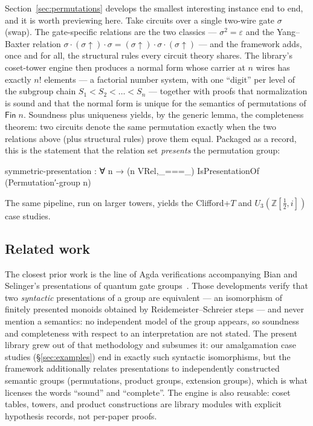 Section~\ref{sec:permutations} develops the smallest interesting instance
end to end, and it is worth previewing here.  Take circuits over a single
two-wire gate $\sigma$ (swap).  The gate-specific relations are the two
classics --- $\sigma^2 = \varepsilon$ and the Yang--Baxter relation $\sigma
\cdot (\sigma{\uparrow}) \cdot \sigma = (\sigma{\uparrow}) \cdot \sigma \cdot
(\sigma{\uparrow})$ --- and the framework adds, once and for all, the
structural rules every circuit theory shares.  The library's coset-tower
engine then produces a normal form whose carrier at $n$ wires has exactly
$n!$ elements --- a factorial number system, with one ``digit'' per level of
the subgroup chain $S_1 < S_2 < \dots < S_n$ --- together with proofs that
normalization is sound and that the normal form is unique for the semantics
of permutations of $\mathsf{Fin}\;n$.  Soundness plus uniqueness yields, by
the generic lemma, the completeness theorem: two circuits denote the same
permutation exactly when the two relations above (plus structural rules)
prove them equal.  Packaged as a record, this is the statement that the
relation set \emph{presents} the permutation group:
\begin{agdacode}
symmetric-presentation :
  ∀ n → (n VRel,_===_) IsPresentationOf (Permutation′-group n)
\end{agdacode}
The same pipeline, run on larger towers, yields the Clifford+$T$ and
$U_3(\mathbb{Z}[\tfrac12,i])$ case studies.

\subsection{Related work}\label{sec:related-intro}

The closest prior work is the line of Agda verifications accompanying Bian
and Selinger's presentations of quantum gate
groups~\cite{bian2023cliffordt2,bian2023cliffordcs3,bian2023thesis}.  Those
developments verify that two \emph{syntactic} presentations of a group are
equivalent --- an isomorphism of finitely presented monoids obtained by
Reidemeister--Schreier steps --- and never mention a semantics: no
independent model of the group appears, so soundness and completeness with
respect to an interpretation are not stated.  The present library grew out
of that methodology and subsumes it: our amalgamation case studies
(\S\ref{sec:examples}) end in exactly such syntactic isomorphisms, but the
framework additionally relates presentations to independently constructed
semantic groups (permutations, product groups, extension groups), which is
what licenses the words ``sound'' and ``complete''.  The engine is also
reusable: coset tables, towers, and product constructions are library
modules with explicit hypothesis records, not per-paper proofs.

